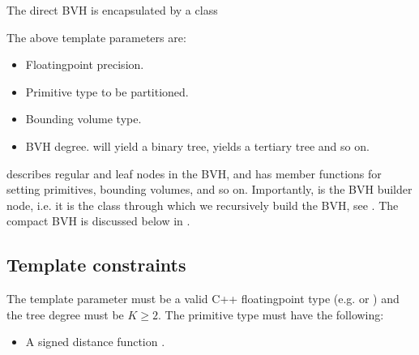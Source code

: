 \documentclass[letterpaper,10pt,english]{sphinxmanual}
\begin{document}
\sphinxAtStartPar
The direct BVH is encapsulated by a class

\begin{sphinxVerbatim}[commandchars=\\\{\}]
\end{sphinxVerbatim}

\sphinxAtStartPar
The above template parameters are:
\begin{itemize}
\item {} 
\sphinxAtStartPar
{} Floating\sphinxhyphen{}point precision.

\item {} 
\sphinxAtStartPar
{} Primitive type to be partitioned.

\item {} 
\sphinxAtStartPar
{} Bounding volume type.

\item {} 
\sphinxAtStartPar
{} BVH degree.  will yield a binary tree,  yields a tertiary tree and so on.

\end{itemize}

\sphinxAtStartPar
{} describes regular and leaf nodes in the BVH, and has member functions for setting primitives, bounding volumes, and so on.
Importantly,  is the BVH builder node, i.e. it is the class through which we recursively build the BVH, see {\hyperref[\detokenize{ImplemBVH:chap-bvhconstruction}]{}}.
The compact BVH is discussed below in {\hyperref[\detokenize{ImplemBVH:chap-linearbvh}]{}}.


\subsection{Template constraints}
\label{\detokenize{ImplemBVH:template-constraints}}
\sphinxAtStartPar
The template parameter  must be a valid C++ floating\sphinxhyphen{}point type (e.g.  or ) and the tree degree must be \(K \geq 2\).
The primitive type  must have the following:
\begin{itemize}
\item {} 
\sphinxAtStartPar
A signed distance function .

\end{itemize}
\end{document}
